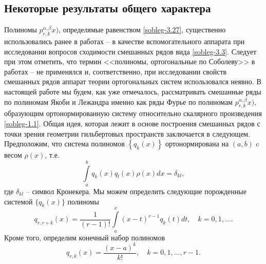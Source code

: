 \subsection{Некоторые результаты общего характера}
Полиномы $p_{r,k}^{\alpha,\beta}x)$, определямые равенством   \eqref{sobleg-3.27},  существенно использовались ранее в работах \cite{Shar11} -- \cite{SHII} в качестве вспомогательного аппарата при исследовании вопросов сходимости смешанных рядов вида \eqref{sobleg-3.3}. Следует при этом отметить, что термин <<полиномы, ортогональные по Соболеву>> в работах \cite{Shar11} -- \cite{SHII}  не применялся и, соответственно, при исследовании свойств смешанных рядов аппарат теории ортогональных систем использовался неявно.  В настоящей работе мы будем, как уже отмечалось, рассматривать смешанные ряды по полиномам Якоби и Лежандра именно как ряды Фурье по полиномам $p_{r,k}^{\alpha,\beta}x)$, образующим  ортонормированную систему относительно скалярного произведения \eqref{sobleg-1.1}. Общая идея, которая лежит в основе построения смешанных рядов с точки зрения геометрии гильбертовых пространств заключается в следующем. Предположим, что система полиномов  $\left\{q_k(x)\right\}$ ортонормирована  на $(a,b)$  c весом   $\rho(x)$, т.е.
 \begin{equation}\label{sobleg-3.4}
\int\limits_a^bq_k(x)q_l(x)\rho(x)dx=\delta_{kl},
\end{equation}
где $\delta_{kl}$ -- символ Кронекера.  Мы можем определить следующие порожденные системой $\{q_k(x)\}$ полиномы
 \begin{equation}\label{sobleg-3.5}
q_{r,r+k}(x) =\frac{1}{(r-1)!}\int\limits_a^x(x-t)^{r-1}q_{k}(t)dt, \quad k=0,1,\ldots.
\end{equation}
 Кроме того, определим конечный набор полиномов
  \begin{equation}\label{sobleg-3.6}
q_{r,k}(x) =\frac{(x-a)^k}{k!}, \quad k=0,1,\ldots, r-1.
\end{equation}

